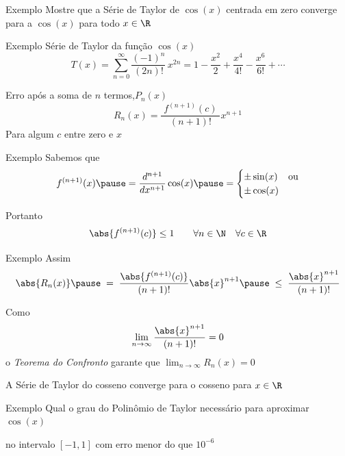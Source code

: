 \addtocounter{exemplo}{1}
\begin{frame}{Exemplo \theexemplo}
  Mostre que a Série de Taylor de \(\cos(x)\) centrada em zero
  converge para a \(\cos(x)\) para todo
  \(x\in\R\)
\end{frame}

\begin{frame}{Exemplo \theexemplo}
  Série de Taylor da função \(\cos(x)\)
  \[
    T(x)
    = \sum_{n=0}^{\infty} \frac{(-1)^n}{(2n)!}\, x^{2n}
    = 1 - \frac{x^2}{2}
    + \frac{x^4}{4!}
    - \frac{x^6}{6!}
    + \cdots
  \]

  \pause
  Erro após a soma de $n$ termos,\(P_n(x)\)
  \[
    R_n(x) = \frac{\;f^{(n+1)}(c)\;}{(n+1)!}x^{n+1}
  \]
  Para algum $c$ entre zero e $x$
\end{frame}

\begin{frame}{Exemplo \theexemplo}
  Sabemos que
  \[
    f^{(n+1)}(x)
    \pause
    = \frac{d^{n+1}}{dx^{n+1}} \cos(x)
    \pause
    = \begin{cases}
       \pm \sin(x) & \text{ou} \\
       \pm \cos(x)
    \end{cases}
  \]

  \pause
  \vspace{\baselineskip}
  Portanto
  \[
    \abs{f^{(n+1)}(c)} \leq 1
    \qquad
    \forall n\in\N
    \quad
    \forall c\in\R
  \]
\end{frame}

\begin{frame}{Exemplo \theexemplo}
  Assim
  \[
    \abs{R_n(x)}
    \pause
    \;=\;    \frac{\abs{f^{(n+1)}(c)}}{(n+1)!}\abs{x}^{n+1}
    \pause
    \;\leq\; \frac{\abs{x}^{n+1}}{(n+1)!}
  \]

  \pause
  Como
  \[
    \lim_{n\to\infty} \frac{\abs{x}^{n+1}}{(n+1)!} = 0
  \]
  \pause
  o \emph{Teorema do Confronto} garante que
  \(
    \lim_{n\to\infty} R_n(x) = 0
  \)

  \pause
  A Série de Taylor do cosseno converge para o cosseno para \(x\in\R\)
\end{frame}

\addtocounter{exemplo}{1}
\begin{frame}{Exemplo \theexemplo}
  Qual o grau do Polinômio de Taylor necessário para aproximar \(\cos(x)\)

  no intervalo \([-1, 1]\) com erro menor do que \(10^{-6}\)
\end{frame}

